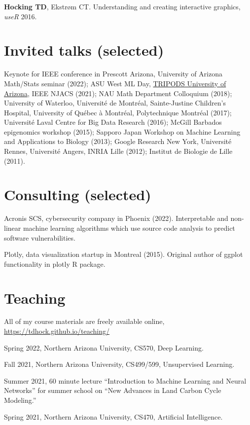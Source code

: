 \documentclass[margin,line]{res}
\begin{document}
\begin{resume}
{\bf Hocking TD}, Ekstr\o m CT. Understanding and creating interactive
graphics, {\it useR} 2016.

\section{\sc Invited talks (selected)}

Keynote for IEEE conference in Prescott Arizona, University of Arizona
Math/Stats seminar (2022); ASU West ML Day,
\href{https://arizona.hosted.panopto.com/Panopto/Pages/Viewer.aspx?id=4e87c8d0-96d2-40d1-808c-ad16014c6962}{TRIPODS
  University of Arizona}, IEEE NJACS (2021); NAU Math Department
Colloquium (2018); University of Waterloo, Université de Montréal,
Sainte-Justine Children's Hospital, University of Québec à Montréal,
Polytechnique Montréal (2017); Universit\'e Laval Centre for Big Data
Research (2016); McGill Barbados epigenomics workshop (2015); Sapporo
Japan Workshop on Machine Learning and Applications to Biology (2013);
Google Research New York, Universit\'e Rennes, Universit\'e Angers,
INRIA Lille (2012); Institut de Biologie de Lille (2011).

\section{\sc Consulting (selected)}

Acronis SCS, cybersecurity company in Phoenix (2022). Interpretable
and non-linear machine learning algorithms which use source code
analysis to predict software vulnerabilities.

Plotly, data visualization startup in Montreal (2015). Original author
of ggplot functionality in plotly R package.

\section{\sc Teaching}

All of my course materials are freely available online,
\url{https://tdhock.github.io/teaching/}

Spring 2022, Northern Arizona University, CS570, Deep Learning.

Fall 2021, Northern Arizona University, CS499/599, Unsupervised Learning.

Summer 2021, 60 minute lecture ``Introduction to Machine Learning and
Neural Networks'' for summer school on ``New Advances in Land Carbon
Cycle Modeling.''

Spring 2021, Northern Arizona University, CS470, Artificial Intelligence.


\end{resume}
\end{document}

